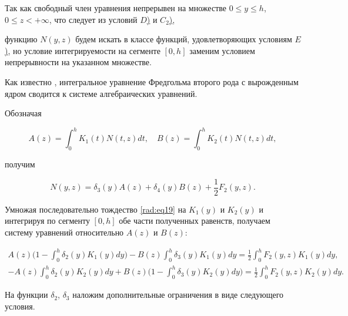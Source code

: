 Так как свободный член уравнения непрерывен на множестве $0\leq y\leq h$, $0\leq z<+\infty$, что следует из условий \hyperlink{rad:D}{$D$)} и \hyperlink{rad:C2}{$C_2$)}, 

функцию $N(y, z)$ будем  искать в классе функций, удовлетворяющих условиям \hyperlink{rad:E}{$E$)}, но условие интегрируемости на сегменте $[0, h]$ заменим условием непрерывности на указанном множестве.



Как известно \cite{radionova:4}, интегральное уравнение Фредгольма второго рода с вырожденным ядром сводится к системе алгебраических уравнений. 

Обозначая 

$$A(z)= \int _0^h K_1(t) N(t,z) dt,\quad  B(z)= \int _0^h K_2(t) N(t,z) dt,$$ 

получим

\begin{equation}\label{rad:eq19}

N(y,z) = \delta_3(y) A(z) + \delta_4(y) B(z) + \frac{1}{2} F_2(y,z).

\end{equation}



Умножая последовательно  тождество \eqref{rad:eq19}  на $K_1(y)$ и $K_2(y)$ и интегрируя по сегменту $[0, h]$ обе части полученных равенств, получаем систему уравнений относительно $A(z)$ и $B(z)$:

\begin{gather}

\label{rad:eq20}

A(z) \biggl(1- \int _0^h \delta_2(y) K_1(y) dy\biggr) - B(z)  \int _0^h \delta_3(y) K_1(y) dy = \frac{1}{2}  \int _0^h F_2(y,z) K_1(y)dy,\\

 - A(z)  \int _0^h \delta_2(y) K_2(y) dy + B(z) \biggl(1- \int _0^h \delta_3(y) K_2(y) dy\biggr) = \frac{1}{2}  \int _0^h F_2(y,z) K_2(y)dy.

 \end{gather}





На функции $\delta_2$, $\delta_3$ наложим дополнительные ограничения в виде следующего условия.





